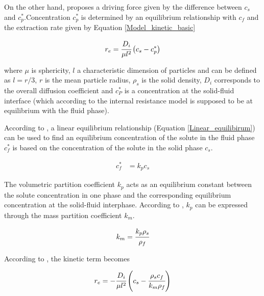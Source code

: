 \documentclass[../Article_Model_Parameters.tex]{subfiles}
\begin{document}
		On the other hand, \citet{Reverchon1996} proposes a driving force given by the difference between $c_s$ and $c_p^*$.Concentration $c_p^*$ is determined by an equilibrium relationship with $c_f$ and the extraction rate given by Equation \ref{Model_kinetic_basic}
			
			{\footnotesize
				\begin{equation} \label{Model_kinetic_basic}
					r_e = \cfrac{D_i}{\mu l^2 }\left(c_s - c_p^* \right)
			\end{equation} }
			
		where $\mu$ is sphericity, $l$ a characteristic dimension of particles and can be defined as $l = r/3$, $r$ is the mean particle radius, $\rho_s$ is the solid density, $D_i$ corresponds to the overall diffusion coefficient and $c_P^*$ is a concentration at the solid-fluid interface (which according to the internal resistance model is supposed to be at equilibrium with the fluid phase). 
			
		According to \citet{Bulley1984}, a linear equilibrium relationship (Equation  \ref{Linear_equilibirum}) can be used to find an equilibrium concentration of the solute in the fluid phase $c_f^*$ is based on the concentration of the solute in the solid phase $c_s$.
			
			{\footnotesize
				\begin{align} \label{Linear_equilibirum}
					c_f^* &= k_p c_s
			\end{align} }
			
			The volumetric partition coefficient $k_p$ acts as an equilibrium constant between the solute concentration in one phase and the corresponding equilibrium concentration at the solid-fluid interphase. According to \citet{Spiro2007}, $k_p$ can be expressed through the mass partition coefficient $k_m$.
			
			{\footnotesize
				\begin{align}
					k_m = \cfrac{k_p \rho_s}{\rho_f}
			\end{align} }
			
			According to \citet{Reverchon1996}, the kinetic term becomes
			
			{\footnotesize
				\begin{equation}
					\label{Model_kinetic_no_sat}
					r_e = -\cfrac{D_i}{ \mu l^2 } \left(c_s - \cfrac{\rho_s c_f}{k_m \rho_f} \right)
			\end{equation} }
\end{document}
